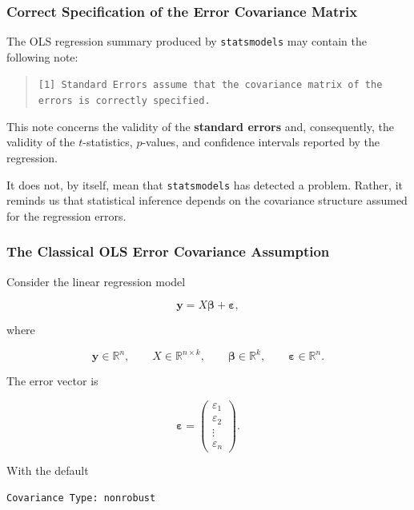 
\subsubsection*{Correct Specification of the Error Covariance Matrix}

The OLS regression summary produced by \texttt{statsmodels} may contain the
following note:

\begin{quote}
\texttt{[1] Standard Errors assume that the covariance matrix of the errors
is correctly specified.}
\end{quote}

This note concerns the validity of the \textbf{standard errors} and,
consequently, the validity of the \(t\)-statistics, \(p\)-values, and
confidence intervals reported by the regression.

It does not, by itself, mean that \texttt{statsmodels} has detected a problem.
Rather, it reminds us that statistical inference depends on the covariance
structure assumed for the regression errors.



\subsubsection*{The Classical OLS Error Covariance Assumption}

Consider the linear regression model

\[
\boxed{
\mathbf{y}
=
X\boldsymbol{\beta}
+
\boldsymbol{\varepsilon},
}
\]

where

\[
\mathbf{y}\in\mathbb{R}^{n},
\qquad
X\in\mathbb{R}^{n\times k},
\qquad
\boldsymbol{\beta}\in\mathbb{R}^{k},
\qquad
\boldsymbol{\varepsilon}\in\mathbb{R}^{n}.
\]

The error vector is

\[
\boldsymbol{\varepsilon}
=
\begin{pmatrix}
\varepsilon_1\\
\varepsilon_2\\
\vdots\\
\varepsilon_n
\end{pmatrix}.
\]

With the default

\begin{verbatim}
Covariance Type: nonrobust
\end{verbatim}

